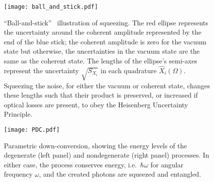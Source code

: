 \begin{figure}
	\centering
	\texttt{[image: ball\_and\_stick.pdf]}
	\caption{``Ball-and-stick''~\cite{} illustration of squeezing. The red ellipse represents the uncertainty around the coherent amplitude represented by the end of the blue stick; the coherent amplitude is zero for the vacuum state but otherwise, the uncertainties in the vacuum state are the same as the coherent state. The lengths of the ellipse's semi-axes represent the uncertainty $\sqrt{S_{X_i}}$ in each quadrature $\hat X_i(\Omega)$. Squeezing the noise, for either the vacuum or coherent state, changes these lengths such that their product is preserved, or increased if optical losses are present, to obey the Heisenberg Uncertainty Principle.}
	\label{fig:ballandstick_simple}
\end{figure}
\begin{figure}[ht]
	\centering
	\texttt{[image: PDC.pdf]}
	\caption{Parametric down-conversion, showing the energy levels of the degenerate (left panel) and nondegenerate (right panel) processes. In either case, the process conserves energy, i.e.\ $\hbar\omega$ for angular frequency $\omega$, and the created photons are squeezed and entangled.}
	\label{fig:PDC_deg_and_nondeg}
\end{figure}

